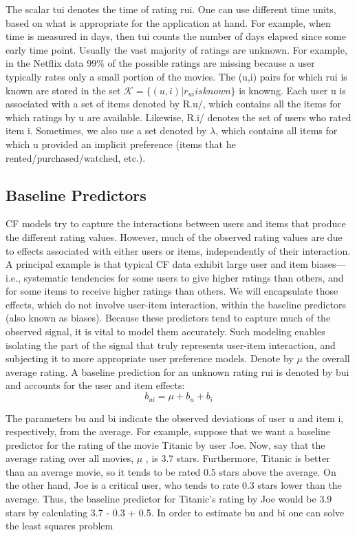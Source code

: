 The scalar tui denotes the time of rating rui. One can use different time units, based on what is appropriate for the application at hand. For example, when time is measured in days, then tui counts the number of days elapsed since some early time point. Usually the vast majority of ratings are unknown. For example, in the Netflix data 99\% of the possible ratings are missing because a user typically rates only a small portion of the movies. The (u,i) pairs for which rui is known are stored in the set $ \mathcal { K } = \{ ( u , i ) | r _ { u i } is known \} $ is knowng. Each user u is associated with a set of items denoted by R.u/, which contains all the items for which ratings by u are available. Likewise, R.i/ denotes the set of users who rated item i. Sometimes, we also use a set denoted by $\lambda$, which contains all items for which u provided an implicit preference (items that he rented/purchased/watched, etc.).

\subsection{Baseline Predictors}

CF models try to capture the interactions between users and items that produce the different rating values. However, much of the observed rating values are due to effects associated with either users or items, independently of their interaction. A principal example is that typical CF data exhibit large user and item biases—i.e., systematic tendencies for some users to give higher ratings than others, and for some items to receive higher ratings than others.
We will encapsulate those effects, which do not involve user-item interaction, within the baseline predictors (also known as biases). Because these predictors tend to capture much of the observed signal, it is vital to model them accurately. Such modeling enables isolating the part of the signal that truly represents user-item interaction, and subjecting it to more appropriate user preference models.
Denote by $\mu$ the overall average rating. A baseline prediction for an unknown rating rui is denoted by bui and accounts for the user and item effects:
$$
b _ { u i } = \mu + b _ { u } + b _ { i }
$$

The parameters bu and bi indicate the observed deviations of user u and item i, respectively, from the average. For example, suppose that we want a baseline predictor for the rating of the movie Titanic by user Joe. Now, say that the average rating over all movies, $\mu$ , is 3.7 stars. Furthermore, Titanic is better than an average movie, so it tends to be rated 0.5 stars above the average. On the other hand, Joe is a critical user, who tends to rate 0.3 stars lower than the average. Thus, the baseline predictor for Titanic’s rating by Joe would be 3.9 stars by calculating 3.7 - 0.3 + 0.5. In order to estimate bu and bi one can solve the least squares problem

